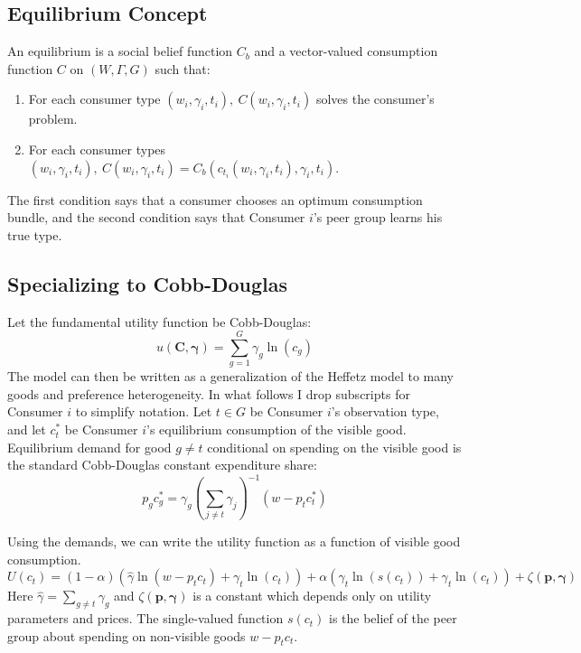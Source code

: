 \subsection{Equilibrium Concept}

An equilibrium is a social belief function $C_b$ and a vector-valued consumption function $C$ on $(W,\Gamma,G)$ such that:
\begin{enumerate}
	\item For each consumer type $(w_i,\gamma_i,t_i), \ C(w_i,\gamma_i,t_i)$ solves the consumer's problem.
    \item For each consumer types $(w_i,\gamma_i,t_i), \ C(w_i,\gamma_i,t_i) = C_b(c_{t_i}(w_i,\gamma_i,t_i),\gamma_i,t_i).$
\end{enumerate}
The first condition says that a consumer chooses an optimum consumption bundle, and the second condition says that Consumer $i$'s peer group learns his true type.

\subsection{Specializing to Cobb-Douglas}

Let the fundamental utility function be Cobb-Douglas:
\[u(\mathbf{C}, \boldsymbol{\gamma}) = \sum_{g=1}^{G} \gamma_g \ln(c_g)\]
The model can then be written as a generalization of the Heffetz model to many goods and preference heterogeneity.\footnotemark{}
In what follows I drop subscripts for Consumer $i$ to simplify notation. Let $t \in G$ be Consumer $i$'s observation type, and let $c_{t}^*$ be Consumer $i$'s equilibrium consumption of the visible good.  Equilibrium demand for good $g\neq t$ conditional on spending on the visible good is the standard Cobb-Douglas constant expenditure share:
\begin{equation}
    \label{eq:opt_cobb}
    p_g c_g^* = \gamma_g\left(\sum_{j\neq t} \gamma_j\right)^{-1}\left(w-p_t c_t^* \right)
\end{equation}

Using the demands, we can write the utility function as a function of visible good consumption.
\begin{equation}
    \label{eq:ufun}
    U(c_t) = (1-\alpha) \left(\hat{\gamma} \ln \left(w-p_t c_t\right) + \gamma_t \ln \left(c_t \right)\right) + \alpha \left(\gamma_t \ln \left(s(c_t)\right) + \gamma_t \ln \left(c_t\right) \right) + \zeta(\mathbf{p},\boldsymbol{\gamma})
\end{equation}
Here $\hat{\gamma} = \sum_{g\neq t} \gamma_g$ and $\zeta(\mathbf{p},\boldsymbol{\gamma})$ is a constant which depends only on utility parameters and prices.  The single-valued function $s(c_t)$ is the belief of the peer group about spending on non-visible goods $w-p_t c_t$. 

